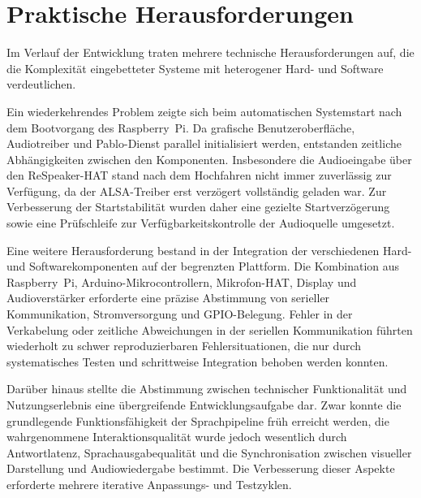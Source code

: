 \section{Praktische Herausforderungen}

Im Verlauf der Entwicklung traten mehrere technische Herausforderungen auf, die die Komplexität eingebetteter Systeme mit heterogener Hard- und Software verdeutlichen.

Ein wiederkehrendes Problem zeigte sich beim automatischen Systemstart nach dem Bootvorgang des Raspberry~Pi. Da grafische Benutzeroberfläche, Audiotreiber und Pablo-Dienst parallel initialisiert werden, entstanden zeitliche Abhängigkeiten zwischen den Komponenten. Insbesondere die Audioeingabe über den ReSpeaker-HAT stand nach dem Hochfahren nicht immer zuverlässig zur Verfügung, da der ALSA-Treiber erst verzögert vollständig geladen war. Zur Verbesserung der Startstabilität wurden daher eine gezielte Startverzögerung sowie eine Prüfschleife zur Verfügbarkeitskontrolle der Audioquelle umgesetzt.

Eine weitere Herausforderung bestand in der Integration der verschiedenen Hard- und Softwarekomponenten auf der begrenzten Plattform. Die Kombination aus Raspberry~Pi, Arduino-Mikrocontrollern, Mikrofon-HAT, Display und Audioverstärker erforderte eine präzise Abstimmung von serieller Kommunikation, Stromversorgung und GPIO-Belegung. Fehler in der Verkabelung oder zeitliche Abweichungen in der seriellen Kommunikation führten wiederholt zu schwer reproduzierbaren Fehlersituationen, die nur durch systematisches Testen und schrittweise Integration behoben werden konnten.

Darüber hinaus stellte die Abstimmung zwischen technischer Funktionalität und Nutzungserlebnis eine übergreifende Entwicklungsaufgabe dar. Zwar konnte die grundlegende Funktionsfähigkeit der Sprachpipeline früh erreicht werden, die wahrgenommene Interaktionsqualität wurde jedoch wesentlich durch Antwortlatenz, Sprachausgabequalität und die Synchronisation zwischen visueller Darstellung und Audiowiedergabe bestimmt. Die Verbesserung dieser Aspekte erforderte mehrere iterative Anpassungs- und Testzyklen.